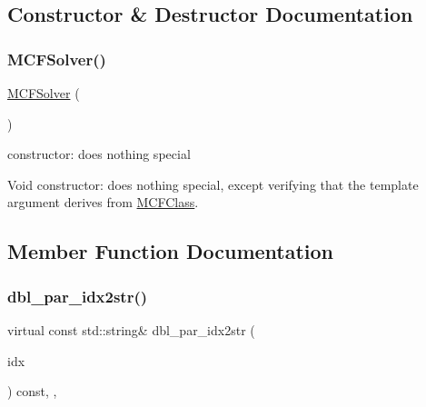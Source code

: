 \subsection{Constructor \& Destructor Documentation}
\mbox{\label{class_s_m_spp__di__unipi__it_1_1_m_c_f_solver_a351d0befbed3bfc9f32468a40411946f}} 
\subsubsection{\texorpdfstring{M\+C\+F\+Solver()}{MCFSolver()}}
{\footnotesize\ttfamily \mbox{\hyperlink{class_s_m_spp__di__unipi__it_1_1_m_c_f_solver}{M\+C\+F\+Solver}} (\begin{DoxyParamCaption}\item[{void}]{ }\end{DoxyParamCaption})\hspace{0.3cm}{\ttfamily [inline]}}



constructor\+: does nothing special 

Void constructor\+: does nothing special, except verifying that the template argument derives from \mbox{\hyperlink{class_m_c_f_class}{M\+C\+F\+Class}}. 

\subsection{Member Function Documentation}
\mbox{\label{class_s_m_spp__di__unipi__it_1_1_m_c_f_solver_a93f1297e7910e91cc18b303376191026}} 
\subsubsection{\texorpdfstring{dbl\+\_\+par\+\_\+idx2str()}{dbl\_par\_idx2str()}}
{\footnotesize\ttfamily virtual const std\+::string\& dbl\+\_\+par\+\_\+idx2str (\begin{DoxyParamCaption}\item[{const \mbox{\hyperlink{class_s_m_spp__di__unipi__it_1_1_thin_compute_interface_aa3d710629ad8c434286726ad810c3b47}{idx\+\_\+type}}}]{idx }\end{DoxyParamCaption}) const\hspace{0.3cm}{\ttfamily [inline]}, {\ttfamily [override]}, {\ttfamily [virtual]}}



